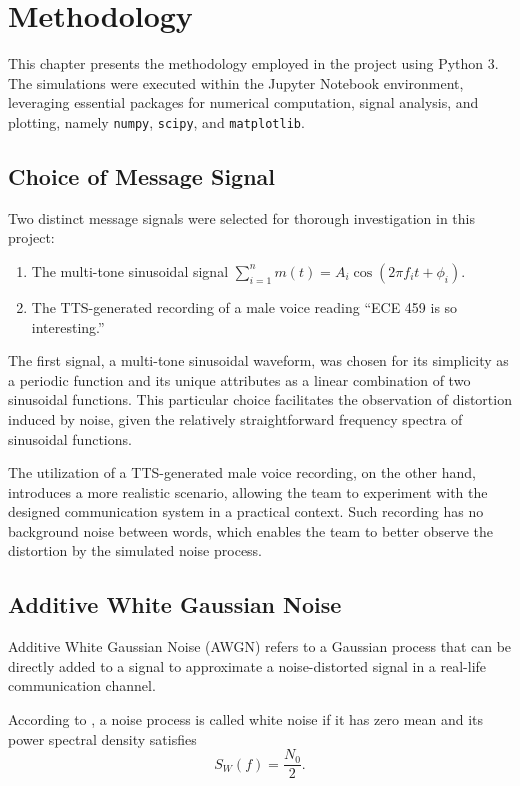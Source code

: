 \documentclass[../ECE459FinalProjectReport.tex]{subfiles}
\begin{document}
\chapter{Methodology}
This chapter presents the methodology employed in the project using Python 3. The simulations were executed within the Jupyter Notebook environment, leveraging essential packages for numerical computation, signal analysis, and plotting, namely \verb|numpy|, \verb|scipy|, and \verb|matplotlib|.

\section{Choice of Message Signal}

Two distinct message signals were selected for thorough investigation in this project:
\begin{enumerate}
    \item The multi-tone sinusoidal signal $\sum_{i=1}^n m (t) = A_i\cos(2\pi f_i t + \phi_i)$.
    \item The TTS-generated recording of a male voice reading ``ECE 459 is so interesting.''
\end{enumerate}

The first signal, a multi-tone sinusoidal waveform, was chosen for its simplicity as a periodic function and its unique attributes as a linear combination of two sinusoidal functions. This particular choice facilitates the observation of distortion induced by noise, given the relatively straightforward frequency spectra of sinusoidal functions. 

The utilization of a TTS-generated male voice recording, on the other hand, introduces a more realistic scenario, allowing the team to experiment with the designed communication system in a practical context. Such recording has no background noise between words, which enables the team to better observe the distortion by the simulated noise process.

\section{Additive White Gaussian Noise}
Additive White Gaussian Noise (AWGN) refers to a Gaussian process that can be directly added to a signal to approximate a noise-distorted signal in a real-life communication channel.

According to \cite[Sec. 8.10]{haykinIntroductionAnalogDigital2007}, a noise process is called white noise if it has zero mean and its power spectral density satisfies
\begin{equation}
    S_W(f) = \frac{N_0}{2}.
\end{equation}
\end{document}
